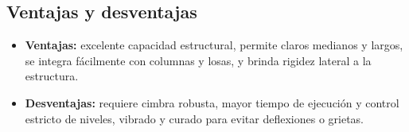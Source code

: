 \documentclass[12pt]{article}
\begin{document}
	\subsection{Ventajas y desventajas}
	\begin{itemize}
		\item \textbf{Ventajas:} excelente capacidad estructural, permite claros medianos y largos, se integra fácilmente con columnas y losas, y brinda rigidez lateral a la estructura.  
		\item \textbf{Desventajas:} requiere cimbra robusta, mayor tiempo de ejecución y control estricto de niveles, vibrado y curado para evitar deflexiones o grietas.
	\end{itemize}
	

	
	

	
			

		
	
	  
	
	
	
	
			
\end{document}
